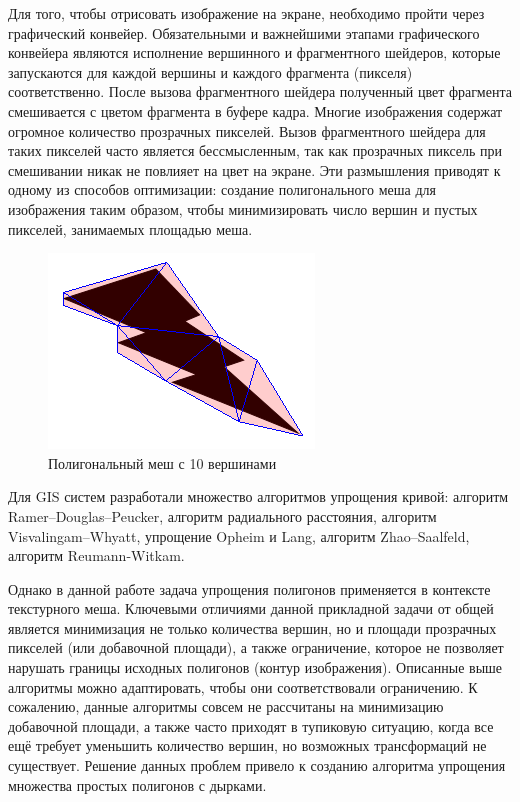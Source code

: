 \documentclass{fefu_thesis/cls/fefu}
\begin{document}
    Для того, чтобы отрисовать изображение на экране, необходимо пройти через графический конвейер. Обязательными и важнейшими этапами графического конвейера являются исполнение вершинного и фрагментного шейдеров, которые запускаются для каждой вершины и каждого фрагмента (пикселя) соответственно. После вызова фрагментного шейдера полученный цвет фрагмента смешивается с цветом фрагмента в буфере кадра. Многие изображения содержат огромное количество прозрачных пикселей. Вызов фрагментного шейдера для таких пикселей часто является бессмысленным, так как прозрачных пиксель при смешивании никак не повлияет на цвет на экране.
    Эти размышления приводят к одному из способов оптимизации: создание полигонального меша для изображения таким образом, чтобы минимизировать число вершин и пустых пикселей, занимаемых площадью меша.

    \begin{figure}[H]
        \centering
        \includegraphics{images/Thunder_approx.png}
        \caption{Полигональный меш с 10 вершинами}
    \end{figure}

    Для GIS систем разработали множество алгоритмов упрощения кривой: алгоритм Ramer–Douglas–Peucker\cite{Ramer}\cite{DouglasPeucker}, алгоритм радиального расстояния\cite{PolylineSimplification}, алгоритм Visvalingam–Whyatt\cite{VisvalingamWhyatt}, упрощение Opheim\cite{Opheim} и Lang\cite{Lang}, алгоритм Zhao–Saalfeld\cite{ZhaoSaalfeld}, алгоритм Reumann-Witkam\cite{ReumannWitkam}.

    Однако в данной работе задача упрощения полигонов применяется в контексте текстурного меша. Ключевыми отличиями данной прикладной задачи от общей является минимизация не только количества вершин, но и площади прозрачных пикселей (или добавочной площади), а также ограничение, которое не позволяет нарушать границы исходных полигонов (контур изображения). Описанные выше алгоритмы можно адаптировать, чтобы они соответствовали ограничению. К сожалению, данные алгоритмы совсем не рассчитаны на минимизацию добавочной площади, а также часто приходят в тупиковую ситуацию, когда все ещё требует уменьшить количество вершин, но возможных трансформаций не существует. Решение данных проблем привело к созданию алгоритма упрощения множества простых полигонов с дырками.
\end{document}
